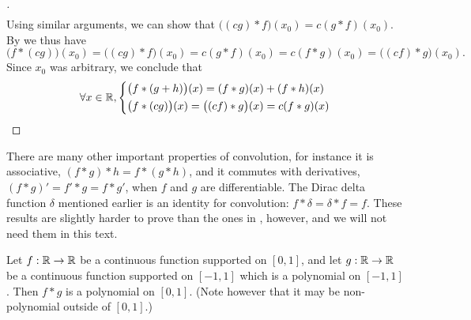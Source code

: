 \begin{proof}[]
\begin{align*}
  \end{align*}
  Using similar arguments, we can show that \(\big((cg) * f\big)(x_0) = c (g * f)(x_0)\).
  By  we thus have
  \[
    \big(f * (cg)\big)(x_0) = \big((cg) * f\big)(x_0) = c(g * f)(x_0) = c(f * g)(x_0) = \big((cf) * g\big)(x_0).
  \]
  Since \(x_0\) was arbitrary, we conclude that
  \[
    \forall x \in \mathbb{R}, \begin{dcases}
      \big(f * (g + h)\big)(x) = (f * g)(x) + (f * h)(x) \\
      \big(f * (cg)\big)(x) = \big((cf) * g\big)(x) = c(f * g)(x)
    \end{dcases}
  \]
\end{proof}

\begin{rmk}\label{ii:3.8.12}
  There are many other important properties of convolution, for instance it is associative, \((f * g) * h = f * (g * h)\), and it commutes with derivatives, \((f * g)' = f' * g = f * g'\), when \(f\) and \(g\) are differentiable.
  The Dirac delta function \(\delta\) mentioned earlier is an identity for convolution:
  \(f * \delta = \delta * f = f\).
  These results are slightly harder to prove than the ones in , however, and we will not need them in this text.
\end{rmk}

\begin{lem}\label{ii:3.8.13}
  Let \(f : \mathbb{R} \to \mathbb{R}\) be a continuous function supported on \([0, 1]\), and let \(g : \mathbb{R} \to \mathbb{R}\) be a continuous function supported on \([-1, 1]\) which is a polynomial on \([-1, 1]\).
  Then \(f * g\) is a polynomial on \([0, 1]\).
  (Note however that it may be non-polynomial outside of \([0, 1].\))
\end{lem}

